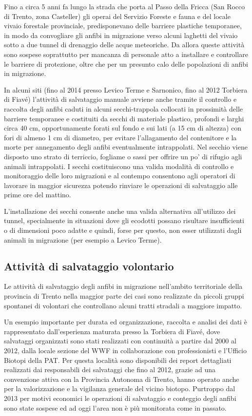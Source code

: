 \documentclass[11pt,a4paper,twoside]{memoir}
\begin{document}
Fino a circa 5 anni fa lungo la strada che porta al Passo della Fricca (San Rocco di Trento, zona Casteller) gli operai del Servizio Foreste e fauna e del locale vivaio forestale provinciale, predisponevano delle barriere plastiche temporanee, in modo da convogliare gli anfibi in migrazione verso alcuni laghetti del vivaio sotto a due tunnel di drenaggio delle acque meteoriche. Da allora queste attività sono sospese soprattutto per mancanza di personale atto a installare e controllare le barriere di protezione, oltre che per un presunto calo delle popolazioni di anfibi in migrazione.

In alcuni siti (fino al 2014 presso Levico Terme e Sarnonico, fino al 2012 Torbiera di Fiavé) l'attività di salvataggio manuale avviene anche tramite il controllo e raccolta degli anfibi caduti in alcuni secchi-trappola collocati in prossimità delle barriere temporanee e costituiti da secchi di materiale plastico, profondi e larghi circa 40 cm, opportunamente forati sul fondo e sui lati (a 15 cm di altezza) con fori di almeno 1 cm di diametro, per evitare l'allagamento del contenitore e la morte per annegamento degli anfibi eventualmente intrappolati. Nel secchio viene disposto uno strato di terriccio, fogliame o sassi per offrire un po’ di rifugio agli animali intrappolati. I secchi costituiscono una valida modalità di controllo e monitoraggio delle loro migrazioni e al contempo consentono agli operatori di lavorare in maggior sicurezza potendo rinviare le operazioni di salvataggio alle prime ore del mattino.

L'installazione dei secchi consente anche una valida alternativa all'utilizzo dei tunnel, specialmente in situazioni dove gli ecodotti possano risultare insufficienti o di dimensioni poco adatte e quindi, forse per questo, non esser utilizzati dagli animali in migrazione (per esempio a Levico Terme).

\subsection{Attività di salvataggio volontario}
\label{subsec:statoanal_iniziative_volontari}
Le attività di salvataggio degli anfibi in migrazione nell'ambito territoriale della provincia di Trento nella maggior parte dei casi sono realizzate da piccoli gruppi spontanei di volontari che controllano alcuni tratti stradali a maggiore impatto.

Un esempio importante per durata ed organizzazione, raccolta e analisi dei dati è rappresentato dall’esperienza maturata presso la Torbiera di Fiavé, dove salvataggi organizzati sono stati realizzati con continuità a partire dal 2000 al 2012, dalla locale sezione del WWF in collaborazione con professionisti e l’Ufficio Biotopi della PAT. Per questa località sono disponibili dei report dettagliati realizzati dai responsabili dei salvataggi che fino al 2012, grazie ad una convenzione attiva con la Provincia Autonoma di Trento, hanno operato anche per la valorizzazione e la vigilanza generale del vicino biotopo. Purtroppo dal 2013 per motivi economici le operazioni di salvataggio e conteggio degli anfibi sono state sospese ed ad oggi l’area non è più monitorata come in passato.
\end{document}
